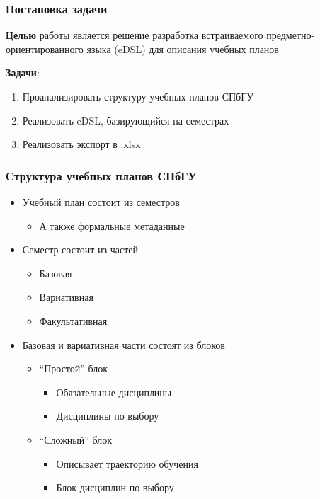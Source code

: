 \documentclass
  [ russian
  , aspectratio=1610 %
  ] {beamer}
\begin{document}
\begin{frame}
    \frametitle{Постановка задачи}
    \textbf{Целью} работы является решение разработка встраиваемого предметно-ориентированного языка (eDSL) для описания учебных планов
    \vspace{1em}

    \textbf{Задачи}:
    \begin{enumerate}
        \item Проанализировать структуру учебных планов СПбГУ
        \item Реализовать eDSL, базирующийся на семестрах
        \item Реализовать экспорт в .xlsx
    \end{enumerate}
\end{frame}


\begin{frame}
    \frametitle{Структура учебных планов СПбГУ}
    \begin{itemize}
        \item Учебный план состоит из семестров
              \begin{itemize}
                  \item А также формальные метаданные
              \end{itemize}
        \item Семестр состоит из частей
              \begin{itemize}
                  \item Базовая
                  \item Вариативная
                  \item Факультативная
              \end{itemize}
        \item Базовая и вариативная части состоят из блоков
              \begin{itemize}
                  \item \enquote{Простой} блок
                        \begin{itemize}
                            \item Обязательные дисциплины
                            \item Дисциплины по выбору
                        \end{itemize}
                  \item \enquote{Сложный} блок
                        \begin{itemize}
                            \item Описывает траекторию обучения
                            \item Блок дисциплин по выбору
                        \end{itemize}
              \end{itemize}
    \end{itemize}
\end{frame}
\end{document}
